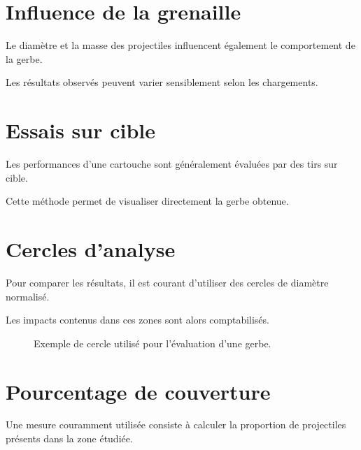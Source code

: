 \section{Influence de la grenaille}

Le diamètre et la masse des projectiles influencent également le comportement
de la gerbe.

Les résultats observés peuvent varier sensiblement selon les chargements.

\section{Essais sur cible}

Les performances d'une cartouche sont généralement évaluées par des tirs sur
cible.

Cette méthode permet de visualiser directement la gerbe obtenue.

\section{Cercles d'analyse}

Pour comparer les résultats, il est courant d'utiliser des cercles de diamètre
normalisé.

Les impacts contenus dans ces zones sont alors comptabilisés.

\begin{figure}[htbp]
\centering


\caption{Exemple de cercle utilisé pour l'évaluation d'une gerbe.}
\label{fig:cercle_analyse}

\end{figure}

\section{Pourcentage de couverture}

Une mesure couramment utilisée consiste à calculer la proportion de projectiles
présents dans la zone étudiée.

